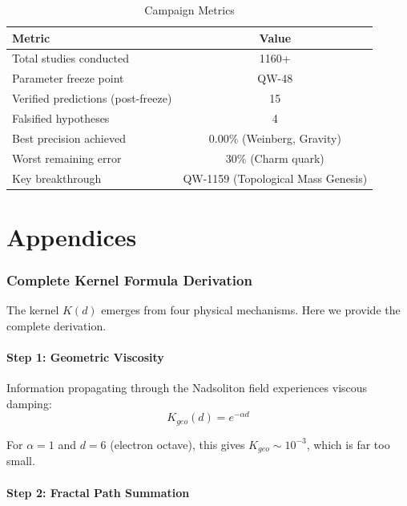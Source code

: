 \documentclass[11pt,a4paper]{book}
\theoremstyle{remark}
\begin{document}
\begin{table}[H]
\centering
\caption{Campaign Metrics}
\begin{tabular}{|l|c|}
\hline
\textbf{Metric} & \textbf{Value} \\
\hline
Total studies conducted & 1160+ \\
Parameter freeze point & QW-48 \\
Verified predictions (post-freeze) & 15 \\
Falsified hypotheses & 4 \\
Best precision achieved & 0.00\% (Weinberg, Gravity) \\
Worst remaining error & 30\% (Charm quark) \\
Key breakthrough & QW-1159 (Topological Mass Genesis) \\
\hline
\end{tabular}
\end{table}

\newpage
\part{Appendices}

\appendix

\section{Complete Kernel Formula Derivation}

The kernel $K(d)$ emerges from four physical mechanisms. Here we provide the complete derivation.

\subsection{Step 1: Geometric Viscosity}

Information propagating through the Nadsoliton field experiences viscous damping:
\begin{equation}
K_{geo}(d) = e^{-\alpha d}
\end{equation}

For $\alpha = 1$ and $d = 6$ (electron octave), this gives $K_{geo} \sim 10^{-3}$, which is far too small.

\subsection{Step 2: Fractal Path Summation}
\end{document}
